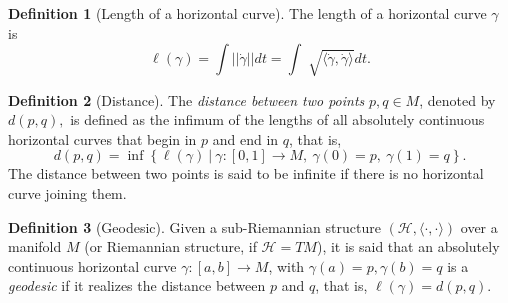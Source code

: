 \documentclass [xcolor=svgnames, t] {beamer}
\theoremstyle{definition}
\newtheorem{df}{Definition}
\theoremstyle{plain}
\theoremstyle{remark}
\begin{document}
\begin{frame}
\begin{df}[Length of a horizontal curve]
	The length of a horizontal curve $ \gamma $ is	
	$$ \ell(\gamma)= \int || \dot{\gamma}|| dt = \int \sqrt[]{ \langle \dot{\gamma},\dot{\gamma} \rangle}dt.  $$ 
\end{df}
\begin{df}[Distance]\label{df:horizontal_distance}
	The \textit{distance between two points} $ p,q\in M $, denoted by $ d(p,q), $   is defined as the infimum of the lengths of all absolutely continuous horizontal curves that begin in $ p $ and end in $ q $, that is, 
$$ d(p,q) = \operatorname{inf} \left\{ \ell(\gamma) \ |\ \gamma:[0,1] \rightarrow {M},\ \gamma(0)=p, \ \gamma(1)=q \right\}. $$ 
The distance between two points is said to be infinite if there is no horizontal curve joining them.
\end{df}
\begin{df}[Geodesic]
	Given a sub-Riemannian structure $ (\mathcal{H}, \langle\cdot,\cdot\rangle) $ over a manifold $ M $  (or Riemannian structure, if $ \mathcal{H}=TM $), it is said that an absolutely continuous horizontal curve $ \gamma:  [a,b] \rightarrow M$, with $ \gamma(a)=p, \gamma(b)=q $ is a \textit{geodesic} if it realizes the distance between $ p $ and $ q $, that is,   
	$ \ell(\gamma)= d(p,q). $ 
\end{df}
\end{frame}
\end{document}
